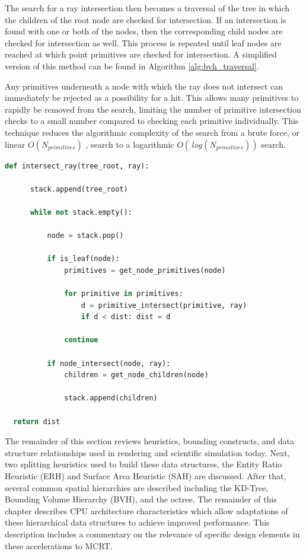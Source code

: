 The search for a ray intersection then becomes a traversal of the tree in which
the children of the root node are checked for intersection. If an intersection
is found with one or both of the nodes, then the corresponding child nodes are
checked for intersection as well. This process is repeated until leaf nodes are
reached at which point primitives are checked for intersection. A simplified
version of this method can be found in Algorithm \ref{alg:bvh_traversal}.

Any primitives underneath a node with which the ray does not intersect can
immediately be rejected as a possibility for a hit. This allows many primitives
to rapidly be removed from the search, limiting the number of primitive
intersection checks to a small number compared to checking each primitive
individually. This technique reduces the algorithmic complexity of the search
from a brute force, or linear $O(N_{primitives})$ , search to a logarithmic
$O(\, log(N_{primitives}))$ search.

\newpage

\begin{lstlisting}[language=Python,basicstyle=\tiny,caption={[A general spatial hierarchy traversal algorithm.]{General algorithm for spatial hierarchy traversal to return the nearest intersection along a ray.}},label={alg:bvh_traversal},captionpos=b]
  def intersect_ray(tree_root, ray):

      stack.append(tree_root)

      while not stack.empty():

          node = stack.pop()

          if is_leaf(node):
              primitives = get_node_primitives(node)
    
              for primitive in primitives:
                  d = primitive_intersect(primitive, ray)
                  if d < dist: dist = d

              continue
      
          if node_intersect(node, ray):
              children = get_node_children(node)

              stack.append(children)

  return dist
\end{lstlisting}

The remainder of this section reviews heuristics, bounding constructs, and data
structure relationships used in rendering and scientific simulation
today. Next, two splitting heuristics used to build these data structures, the Entity Ratio Heuristic (ERH) and
Surface Area Heuristic (SAH) are discussed. After that, several common spatial
hierarchies are described including the KD-Tree, Bounding Volume Hierarchy
(BVH), and the octree. The remainder of this chapter describes CPU architecture
characteristics which allow adaptations of these hierarchical data structures to
achieve improved performance. This description includes a commentary on the
relevance of specific design elements in these accelerations to MCRT.

